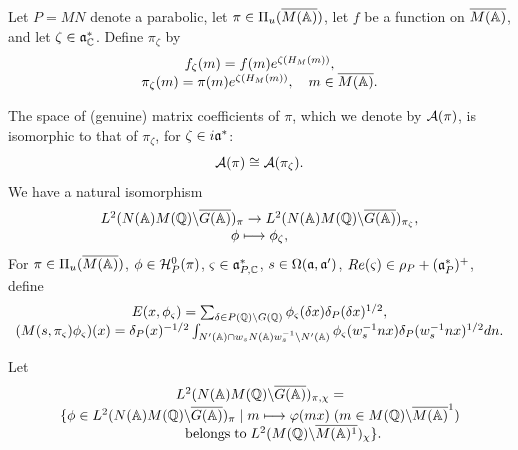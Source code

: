 Let $P=MN$ denote a parabolic, let $\pi \in \Pi _u(\overline{M({\Bbb{A}})})$,
let $f$ be a function on $\overline{M({\Bbb{A}})}$,
and let $\zeta\in {\frak{a}}^*_{\Bbb{C}}$. Define $\pi_\zeta$ by
\begin{equation}
\begin{array}{c}
f_\zeta (m)=f(m)e^{\zeta(H_M(m))},\\
\pi_\zeta(m)=\pi(m)e^{\zeta(H_M(m))},\ \ \ m\in \overline{M({\Bbb{A}})}.
\end{array}
\end{equation}

The space of (genuine) matrix coefficients of $\pi$, which we denote by
${\cal A}(\pi)$, is isomorphic to that of $\pi_\zeta$, for
$\zeta\in i{\frak{a}}^*$:
$$
{\cal A}(\pi)\cong {\cal A}(\pi_\zeta).
$$
We have a natural isomorphism
$$
\begin{array}{c}
L^2(N({\Bbb{A}})M({\Bbb{Q}})\backslash \overline{G({\Bbb{A}})})_\pi
\rightarrow
L^2(N({\Bbb{A}})M({\Bbb{Q}})\backslash \overline{G({\Bbb{A}})})_{\pi_\zeta},
\\
\phi\longmapsto \phi_\zeta,
\end{array}
$$
For $\pi \in \Pi _u(\overline{M({\Bbb{A}})})$,
$\phi \in {\cal H}_P^0(\pi )$,
$\varsigma \in {\frak{a}}_{P,{\Bbb C}}^{*}$,
$s\in \Omega ({\frak{a}},{\frak{a}}^{\prime})$,
$Re(\varsigma )\in \rho _P+({\frak{a}}_P^{*})^{+}$, define
\begin{equation}
\begin{array}{c}
E(x,\phi _\varsigma )
=\sum_{\delta \in P({\Bbb{Q}})\backslash G({\Bbb{Q}})}
\phi _\varsigma (\delta x)\delta _P(\delta x)^{1/2}, \\
(M(s,\pi _\varsigma )\phi _\varsigma )(x)
=\delta_P(x)^{-1/2}
\int_{N^{\prime }({\Bbb{A}})\cap w_sN({\Bbb{A}})w_s^{-1}\backslash
N^{\prime }({\Bbb{A}})}
\phi _\varsigma (w_s^{-1}nx)\delta_P(w_s^{-1}nx)^{1/2}dn.
\end{array}
\end{equation}

Let
\[
\begin{array}{c}
L^2(N({\Bbb{A}})M({\Bbb{Q}})\backslash \overline{G({\Bbb{A}})})_{\pi,\chi}
=\\
\{\phi \in
L^2(N({\Bbb{A}})M({\Bbb{Q}})\backslash \overline{G({\Bbb{A}})})_{\pi}
\;|\;m\longmapsto \varphi (mx)
\;(m\in M({\Bbb{Q}})\backslash \overline{M({\Bbb{A}})}^1) \\
{\rm \;\;\;\;\;\;\;\;\;\;\;\;belongs\;to}
\;L^2(M({\Bbb{Q}})\backslash \overline{M({\Bbb{A}})^1})_\chi \}.
\end{array}
\]

